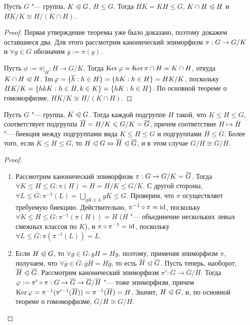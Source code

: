 \begin{theorem}
	Пусть $G$ "--- группа, $K \trianglelefteqslant G$, $H \le G$. Тогда $HK = KH \le G$, $K \cap H \trianglelefteqslant H$ и $HK / K \cong H / (K \cap H)$.
\end{theorem}

\begin{proof}
	Первая утверждение теоремы уже было доказано, поэтому докажем оставшиеся два. Для этого рассмотрим канонический эпиморфизм $\pi: G \hm\to G / K$ и $\forall g \in G$ обозначим $\overline{g} := \pi(g)$.
	
	Пусть $\phi := \pi|_H : H \to G/ K$. Тогда $\operatorname{Ker}\varphi = \operatorname{Ker}\pi \cap H = K \cap H$, откуда $K \cap H \trianglelefteqslant H$. $\im\phi = \{\overline{h}: h \in H\} = \{hK: h \hm\in H\} = HK / K$, поскольку $HK / K \hm= \{hkK: h \in H, k \hm\in K\} = \{hK: h \in H\}$. По основной теореме о гомоморфизме, $HK / K \cong H / (K \cap H)$.
\end{proof}

\begin{theorem}
	Пусть $G$ "--- группа, $K \trianglelefteqslant G$. Тогда каждой подгруппе $H$ такой, что $K \le H \le G$, соответствует подгруппа $\overline{H} = H / K \hm\le G / K = \overline{G}$, причем соответствие $H \mapsto \overline{H}$ "--- биекция между подгруппами вида $K \le H \le G$ и подгруппами $\overline{H} \le \overline{G}$. Более того, если $K \le H \le G$, то $H \trianglelefteqslant G \Leftrightarrow \overline{H} \trianglelefteqslant \overline{G}$, и в этом случае $G / H \cong \overline{G} / \overline{H}$.
\end{theorem}

\begin{proof}~
	\begin{enumerate}
		\item Рассмотрим канонический эпиморфизм $\pi: G \hm\to G / K = \overline{G}$. Тогда $\forall K \le H \le G: \pi(H) =\overline{H} = H / K \le G / K$. С другой стороны, $\forall L \le \overline{G}: \pi^{-1}(L) = \bigcup\limits_{gK \in L}gK \le G$. Проверим, что $\pi$ осуществляет требуемую биекцию. Действительно, $\pi^{-1}\circ\pi = \operatorname{id}$, поскольку $\forall K \le H \le G: \pi^{-1}(\pi(H)) = H$ ($H$ "--- объединение нескольких левых смежных классов по $K$), и $\pi\circ\pi^{-1} = \operatorname{id}$, поскольку $\forall L \le \overline{G}: \pi(\pi^{-1}(L)) = L$.
		
		\item Если $H \trianglelefteqslant G$, то $\forall g \in G: gH = Hg$, поэтому, применяя эпиморфизм $\pi$, получаем, что $\forall \overline{g} \in \overline{G}: \overline{g}\overline{H} = \overline{H}\overline{g}$, то есть $\overline{H} \trianglelefteqslant \overline{G}$. Пусть теперь, наоборот, $\overline{H} \trianglelefteqslant \overline{G}$. Рассмотрим канонический эпиморфизм $\pi': \overline{G} \to \overline{G} / \overline{H}$. Тогда $\phi := \pi'\circ\pi: G \hm\to \overline{G} \hm\to \overline{G} / \overline{H}$ "--- тоже эпиморфизм, причем $\ke\phi = \pi^{-1}(\pi'^{-1}(\overline{H})) \hm= \pi^{-1}(\overline{H}) = H$. Значит, $H \trianglelefteqslant G$, и, по основной теореме о гомоморфизме, $\overline{G} / \overline{H} \cong G / H$.
	\end{enumerate}
\end{proof}


